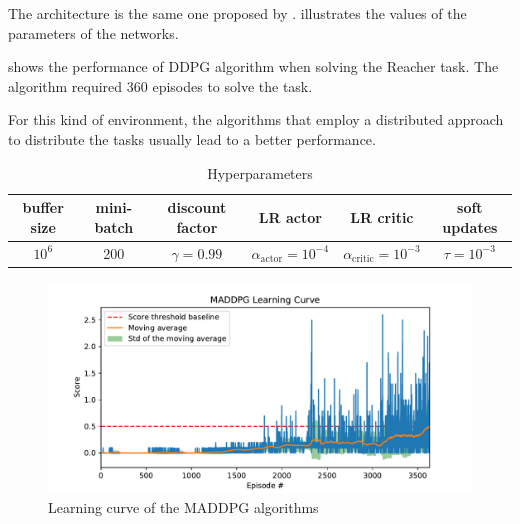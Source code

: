 \documentclass[12pt,english]{article}
\begin{document}
The architecture is the same one proposed by \citeauthor{lillicrap:16}\cite{lillicrap:16}.  illustrates the values of the parameters of the networks. 

 shows the performance of DDPG algorithm when solving the Reacher task. The algorithm required \(360\) episodes to solve the task.

For this kind of environment, the algorithms that employ a distributed approach to distribute the tasks usually lead to a better performance.

\begin{table}
\footnotesize
{
  \caption{Hyperparameters}\label{tb:parameters}
  \centering
  \begin{tabular}{cccccc}
  \toprule
    \textbf{buffer size} & \textbf{mini-batch} & \textbf{discount factor} & \textbf{LR actor} & \textbf{LR critic} & \textbf{soft updates}\\
  \midrule
   \(10^6\) & 200 & \(\gamma = 0.99\) & \(\alpha_{\text{actor}} = 10^{-4}\) & \(\alpha_{\text{critic}} = 10^{-3}\) & \(\tau=10^{-3}\)\\
  \bottomrule
  \end{tabular}
}
\end{table}

\begin{figure}%
    \centering
    \includegraphics[width=\textwidth]{maddpg_score}
    \caption{Learning curve of the MADDPG algorithms}\label{fig:score}
\end{figure}



\end{document}
